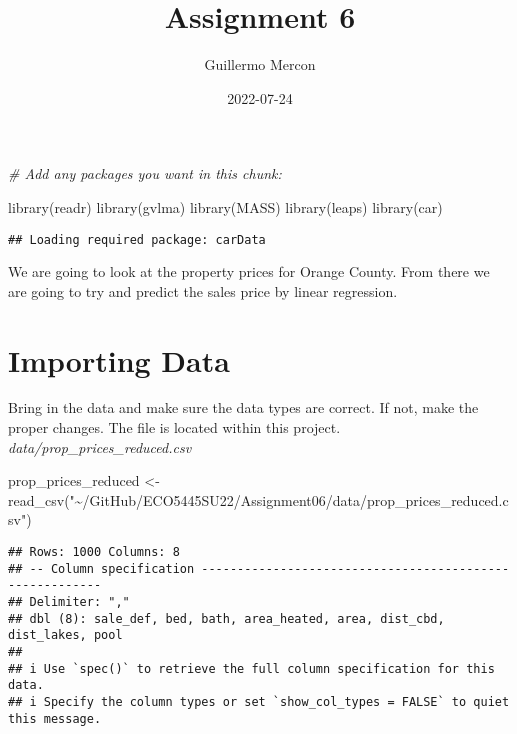 \documentclass[
]{article}
\title{Assignment 6}
\author{Guillermo Mercon}
\date{2022-07-24}
\newenvironment{Shaded}{\begin{snugshade}}{\end{snugshade}}
\newcommand{\CommentTok}[1]{\textcolor[rgb]{0.56,0.35,0.01}{\textit{#1}}}
\newcommand{\FunctionTok}[1]{\textcolor[rgb]{0.00,0.00,0.00}{#1}}
\newcommand{\NormalTok}[1]{#1}
\newcommand{\OtherTok}[1]{\textcolor[rgb]{0.56,0.35,0.01}{#1}}
\newcommand{\StringTok}[1]{\textcolor[rgb]{0.31,0.60,0.02}{#1}}
\begin{document}
\maketitle

{
\setcounter{tocdepth}{2}
\tableofcontents
}
\begin{Shaded}
\begin{Highlighting}[]
\CommentTok{\# Add any packages you want in this chunk:}

\FunctionTok{library}\NormalTok{(readr)}
\FunctionTok{library}\NormalTok{(gvlma)}
\FunctionTok{library}\NormalTok{(MASS)}
\FunctionTok{library}\NormalTok{(leaps)}
\FunctionTok{library}\NormalTok{(car)}
\end{Highlighting}
\end{Shaded}

\begin{verbatim}
## Loading required package: carData
\end{verbatim}

We are going to look at the property prices for Orange County. From
there we are going to try and predict the sales price by linear
regression.

\hypertarget{importing-data}{%
\section{Importing Data}\label{importing-data}}

Bring in the data and make sure the data types are correct. If not, make
the proper changes. The file is located within this project.
\emph{data/prop\_prices\_reduced.csv}

\begin{Shaded}
\begin{Highlighting}[]
\NormalTok{prop\_prices\_reduced }\OtherTok{\textless{}{-}} \FunctionTok{read\_csv}\NormalTok{(}\StringTok{"\textasciitilde{}/GitHub/ECO5445SU22/Assignment06/data/prop\_prices\_reduced.csv"}\NormalTok{)}
\end{Highlighting}
\end{Shaded}

\begin{verbatim}
## Rows: 1000 Columns: 8
## -- Column specification --------------------------------------------------------
## Delimiter: ","
## dbl (8): sale_def, bed, bath, area_heated, area, dist_cbd, dist_lakes, pool
## 
## i Use `spec()` to retrieve the full column specification for this data.
## i Specify the column types or set `show_col_types = FALSE` to quiet this message.
\end{verbatim}
\end{document}
